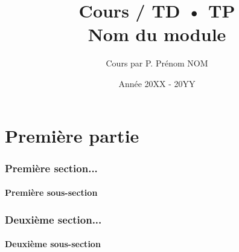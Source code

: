 \documentclass[11pt, a4paper, french]{article}
\title{\textbf{Cours / TD • TP}\\Nom du module}
\author{Cours par P\up{r}. Prénom NOM}
\date{Année 20XX - 20YY}
\begin{document}
\maketitle
\tableofcontents

\newpage

\part{Première partie} 
\section{Première section...}
\subsection{Première sous-section}

\section{Deuxième section...}
\subsection{Deuxième sous-section}
\end{document}
